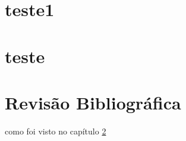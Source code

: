 \chapter{teste1}
\chapter{teste}\label{ch:teste}
\chapter{Revisão Bibliográfica}
como foi visto no capítulo \ref{ch:teste}

